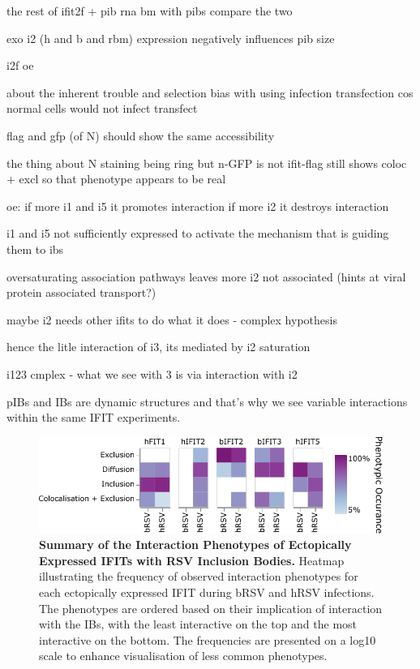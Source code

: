 the rest of ifit2f + pib
rna bm with pibs 
compare the two

exo i2 (h and b and rbm) expression negatively influences pib size

i2f oe

about the inherent trouble and selection bias with using infection transfection cos normal cells would not infect transfect

flag and gfp (of N) should show the same accessibility

the thing about N staining being ring but n-GFP is not
ifit-flag still shows coloc + excl so that phenotype appears to be real

oe:
if more i1 and i5 it promotes interaction
if more i2 it destroys interaction


i1 and i5 not sufficiently expressed to activate the mechanism that is guiding them to ibs

oversaturating association pathways leaves more i2 not associated (hints at viral protein associated transport?)

maybe i2 needs other ifits to do what it does - complex hypothesis

hence the litle interaction of i3, its mediated by i2 saturation

i123 cmplex - what we see with 3 is via interaction with i2

pIBs and IBs are dynamic structures and that's why we see variable interactions within the same IFIT experiments.

\begin{figure}
    \centering
    \includegraphics[width=1\linewidth]{09. Chapter 4/Figs/heatmap-infection-transfection.pdf}
    \caption[Summary of the Interaction Phenotypes of Ectopically Expressed IFITs with RSV Inclusion Bodies.]{\textbf{Summary of the Interaction Phenotypes of Ectopically Expressed IFITs with RSV Inclusion Bodies.} Heatmap illustrating the frequency of observed interaction phenotypes for each ectopically expressed IFIT during bRSV and hRSV infections. The phenotypes are ordered based on their implication of interaction with the IBs, with the least interactive on the top and the most interactive on the bottom. The frequencies are presented on a log10 scale to enhance visualisation of less common phenotypes.}
    \label{fig:Summary of the Interaction Phenotypes of Ectopically Expressed IFITs with RSV Inclusion Bodies}
\end{figure}


